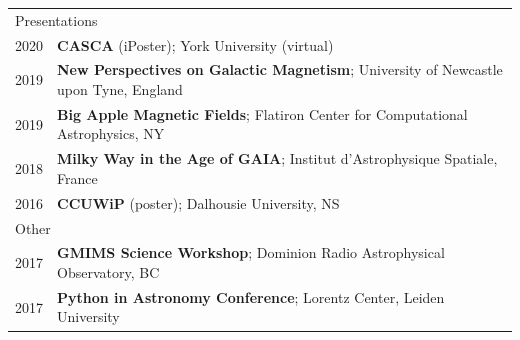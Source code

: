 \documentclass[10pt]{res} %
\begin{document}
\begin{resume}
\begin{table}[h!]
\begin{tabularx}{\textwidth}{lX}
\multicolumn{2}{l}{ \rule{0pt}{3ex} \large \hspace{-12pt} Presentations \dotfill \rule[-1.2ex]{0pt}{0pt}} \\
2020 & \textbf{CASCA} (iPoster); York University (virtual) \\
2019 & \textbf{New Perspectives on Galactic Magnetism}; University of Newcastle upon Tyne, England \\
2019 & \textbf{Big Apple Magnetic Fields}; Flatiron Center for Computational Astrophysics, NY \\
2018 & \textbf{Milky Way in the Age of GAIA}; Institut d'Astrophysique Spatiale, France \\
2016 & \textbf{CCUWiP} (poster); Dalhousie University, NS \\
\multicolumn{2}{l}{ \rule{0pt}{3ex} \large \hspace{-12pt} Other \dotfill \rule[-1.2ex]{0pt}{0pt}}  \\
2017 & \textbf{GMIMS Science Workshop}; Dominion Radio Astrophysical Observatory, BC \\
2017 & \textbf{Python in Astronomy Conference}; Lorentz Center, Leiden University 
\end{tabularx}
\end{table}



\end{resume}
\end{document}
